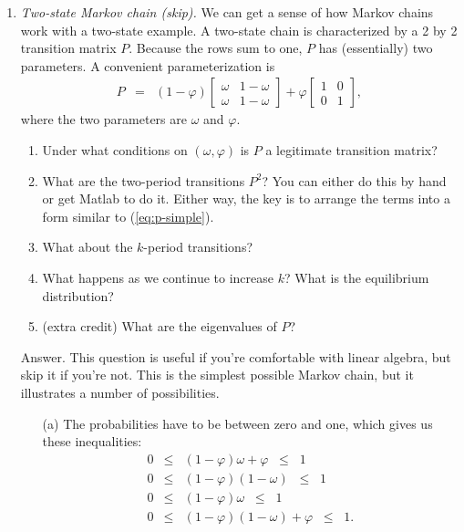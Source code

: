 \documentclass[11pt]{article}
\begin{document}
\begin{enumerate}
\item {\it Two-state Markov chain (skip).\/}
We can get a sense of how Markov chains work with a two-state example.
A two-state chain is characterized by a 2 by 2 transition matrix $P$.
Because the rows sum to one, $P$ has (essentially) two parameters.
A convenient parameterization is
\begin{eqnarray}
    P &=& (1-\varphi)
        \left[
        \begin{array}{cc}
        \omega & 1-\omega \\ \omega & 1-\omega
        \end{array}
        \right]
        + \varphi
        \left[
        \begin{array}{cc}
        1  & 0  \\  0  & 1
        \end{array}
        \right] ,
        \label{eq:p-simple}
\end{eqnarray}
where the two parameters are $\omega$ and $\varphi$.
%
\begin{enumerate}
\item Under what conditions on $(\omega, \varphi)$ is $P$ a legitimate
transition matrix?
\item What are the two-period transitions $P^2$?
You can either do this by hand or get Matlab to do it.  Either way,
the key is to arrange the terms into a form similar to (\ref{eq:p-simple}).
\item What about the $k$-period transitions?
\item What happens as we continue to increase $k$?
What is the equilibrium distribution?
\item (extra credit) What are the eigenvalues of $P$?
\end{enumerate}
%
Answer.
This question is useful if you're comfortable with linear algebra,
but skip it if you're not.
This is the simplest possible Markov chain,
but it illustrates a number of possibilities.
\begin{enumerate}
\item [(a)] The probabilities have to be between zero and one,
which gives us these inequalities:
\begin{eqnarray*}
    0 &\leq& (1-\varphi) \omega + \varphi \;\;\leq\;\; 1 \\
    0 &\leq& (1-\varphi) (1-\omega) \;\;\leq\;\; 1 \\
    0 &\leq& (1-\varphi) \omega \;\;\leq\;\; 1 \\
    0 &\leq& (1-\varphi) (1-\omega) + \varphi \;\;\leq\;\; 1 .

\end{eqnarray*}
\end{enumerate}
\end{enumerate}
\end{document}
